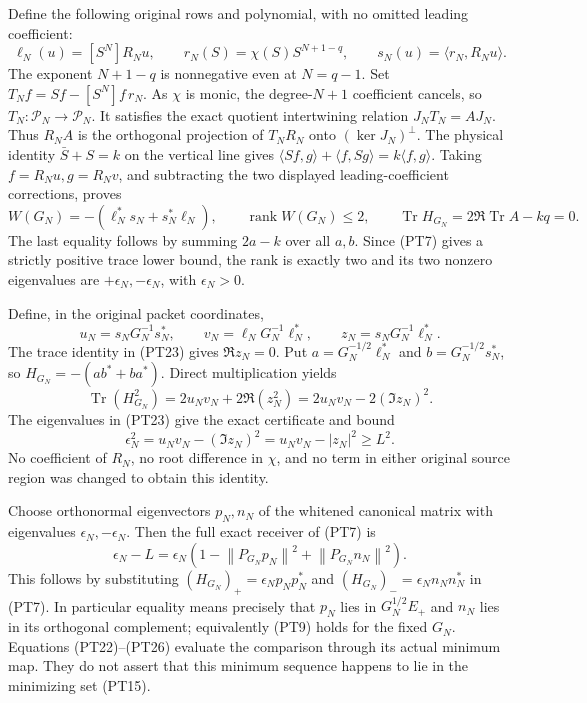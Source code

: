 \documentclass[11pt]{article}
\newcommand{\PP}{\mathcal P}
\newcommand{\norm}[1]{\left\lVert#1\right\rVert}
\DeclareMathOperator{\Tr}{Tr}
\DeclareMathOperator{\rank}{rank}
\begin{document}
Define the following original rows and polynomial, with no omitted
leading coefficient:
\begin{equation}\tag{PT22}
 \ell_N(u)=[S^N]R_Nu,\qquad
 r_N(S)=\chi(S)S^{N+1-q},\qquad
 s_N(u)=\langle r_N,R_Nu\rangle.
\end{equation}
The exponent \(N+1-q\) is nonnegative even at \(N=q-1\).
Set \(T_Nf=Sf-[S^N]f\,r_N\). As \(\chi\) is monic,
the degree-\(N+1\) coefficient cancels, so \(T_N:\PP_N\to\PP_N\).
It satisfies the exact quotient intertwining relation
\(J_NT_N=AJ_N\). Thus \(R_NA\) is the orthogonal projection
of \(T_NR_N\) onto \((\ker J_N)^\perp\).
The physical identity \(\bar S+S=k\) on the vertical line gives
\(\langle Sf,g\rangle+\langle f,Sg\rangle=k\langle f,g\rangle\).
Taking \(f=R_Nu,g=R_Nv\), and subtracting the two displayed
leading-coefficient corrections, proves
\begin{equation}\tag{PT23}
 W(G_N)=-(\ell_N^*s_N+s_N^*\ell_N),\qquad
 \rank W(G_N)\le2,\qquad
 \Tr H_{G_N}=2\Re\Tr A-kq=0.
\end{equation}
The last equality follows by summing \(2a-k\) over all \(a,b\).
Since (PT7) gives a strictly positive trace lower bound, the rank
is exactly two and its two nonzero eigenvalues are
\(+\epsilon_N,-\epsilon_N\), with \(\epsilon_N>0\).

Define, in the original packet coordinates,
\begin{equation}\tag{PT24}
 u_N=s_NG_N^{-1}s_N^*,\qquad
 v_N=\ell_NG_N^{-1}\ell_N^*,\qquad
 z_N=s_NG_N^{-1}\ell_N^*.
\end{equation}
The trace identity in (PT23) gives \(\Re z_N=0\). Put
\(a=G_N^{-1/2}\ell_N^*\) and \(b=G_N^{-1/2}s_N^*\),
so \(H_{G_N}=-(ab^*+ba^*)\). Direct multiplication yields
\[
 \Tr(H_{G_N}^2)=2u_Nv_N+2\Re(z_N^2)
                 =2u_Nv_N-2(\Im z_N)^2.
\]
The eigenvalues in (PT23) give the exact certificate and bound
\begin{equation}\tag{PT25}
 \epsilon_N^2=u_Nv_N-(\Im z_N)^2
             =u_Nv_N-|z_N|^2\ge L^2.
\end{equation}
No coefficient of \(R_N\), no root difference in \(\chi\),
and no term in either original source region was changed to obtain
this identity.

Choose orthonormal eigenvectors \(p_N,n_N\) of the whitened
canonical matrix with eigenvalues \(\epsilon_N,-\epsilon_N\).
Then the full exact receiver of (PT7) is
\begin{equation}\tag{PT26}
 \epsilon_N-L
 =\epsilon_N\left(1-\norm{P_{G_N}p_N}^2
                         +\norm{P_{G_N}n_N}^2\right).
\end{equation}
This follows by substituting
\((H_{G_N})_+=\epsilon_Np_Np_N^*\) and
\((H_{G_N})_-=\epsilon_Nn_Nn_N^*\) in (PT7).
In particular equality means precisely that \(p_N\) lies in
\(G_N^{1/2}E_+\) and \(n_N\) lies in its orthogonal complement;
equivalently (PT9) holds for the fixed \(G_N\).
Equations (PT22)--(PT26) evaluate the comparison through its actual
minimum map. They do not assert that this minimum sequence happens
to lie in the minimizing set (PT15).
\end{document}
